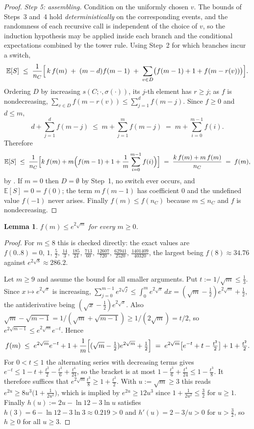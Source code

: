 \documentclass[11pt]{article}
\theoremstyle{plain}
\newtheorem{lemma}[theorem]{Lemma}
\theoremstyle{definition}
\begin{document}
\begin{proof}
\smallskip\noindent\emph{Step 5: assembling.}
Condition on the uniformly chosen $v$. The bounds of Steps~3 and~4 hold
\emph{deterministically} on the corresponding events, and the randomness
of each recursive call is independent of the choice of $v$, so the
induction hypothesis may be applied inside each branch and the
conditional expectations combined by the tower rule. Using Step~2 for
which branches incur a switch,
\[
  \mathbb{E}[S]\;\le\;\frac1{n_C}\Bigl[\,k\,f(m)\;+\;(m-d)f(m-1)\;+\;\sum_{v\in D}\bigl(f(m-1)+1+f(m-r(v))\bigr)\Bigr].
\]
Ordering $D$ by increasing $s(C;\cdot,\sigma(\cdot))$, its $j$-th element
has $r\ge j$; as $f$ is nondecreasing,
$\sum_{v\in D}f(m-r(v))\le\sum_{j=1}^{d}f(m-j)$. Since $f\ge0$ and
$d\le m$,
\[
  d+\sum_{j=1}^{d}f(m-j)\;\le\;m+\sum_{j=1}^{m}f(m-j)\;=\;m+\sum_{i=0}^{m-1}f(i).
\]
Therefore
\[
  \mathbb{E}[S]\;\le\;\frac1{n_C}\Bigl[k\,f(m)+m\Bigl(f(m-1)+1+\frac1m\sum_{i=0}^{m-1}f(i)\Bigr)\Bigr]
  \;=\;\frac{k\,f(m)+m\,f(m)}{n_C}\;=\;f(m),
\]
by . If $m=0$ then $D=\emptyset$ by Step~1, no switch ever
occurs, and $\mathbb{E}[S]=0=f(0)$; the term $m\,f(m-1)$ has coefficient
$0$ and the undefined value $f(-1)$ never arises. Finally
$f(m)\le f(n_C)$ because $m\le n_C$ and $f$ is nondecreasing.
\end{proof}

\begin{lemma}\label{lem:fbound}
$f(m)\le e^{2\sqrt m}$ for every $m\ge0$.
\end{lemma}

\begin{proof}
For $m\le8$ this is checked directly: the exact values are
$f(0..8)=0,\,1,\,\tfrac52,\,\tfrac{14}3,\,\tfrac{185}{24},\,\tfrac{713}{60},\,\tfrac{12607}{720},\,\tfrac{62941}{2520},\,\tfrac{1401409}{40320}$,
the largest being $f(8)\approx34.76$ against $e^{2\sqrt8}\approx286.2$.

Let $m\ge9$ and assume the bound for all smaller arguments. Put
$t:=1/\sqrt m\le\tfrac13$. Since $x\mapsto e^{2\sqrt x}$ is increasing,
$\sum_{j=0}^{m-1}e^{2\sqrt j}\le\int_0^{m}e^{2\sqrt x}\,dx=(\sqrt m-\tfrac12)e^{2\sqrt m}+\tfrac12$,
the antiderivative being $(\sqrt x-\tfrac12)e^{2\sqrt x}$. Also
$\sqrt m-\sqrt{m-1}=1/(\sqrt m+\sqrt{m-1})\ge 1/(2\sqrt m)=t/2$, so
$e^{2\sqrt{m-1}}\le e^{2\sqrt m}e^{-t}$. Hence
\[
  f(m)\;\le\;e^{2\sqrt m}e^{-t}+1+\frac1m\Bigl[(\sqrt m-\tfrac12)e^{2\sqrt m}+\tfrac12\Bigr]
  \;=\;e^{2\sqrt m}\bigl[e^{-t}+t-\tfrac{t^{2}}2\bigr]+1+\tfrac{t^{2}}2 .
\]
For $0<t\le1$ the alternating series with decreasing terms gives
$e^{-t}\le1-t+\tfrac{t^2}2-\tfrac{t^3}6+\tfrac{t^4}{24}$, so the bracket
is at most $1-\tfrac{t^3}6+\tfrac{t^4}{24}\le1-\tfrac{t^3}8$. It
therefore suffices that $e^{2\sqrt m}\tfrac{t^3}8\ge1+\tfrac{t^2}2$.
With $u:=\sqrt m\ge3$ this reads $e^{2u}\ge8u^{3}\bigl(1+\tfrac1{2u^{2}}\bigr)$,
which is implied by $e^{2u}\ge12u^{3}$ since
$1+\tfrac1{2u^2}\le\tfrac32$ for $u\ge1$. Finally
$h(u):=2u-\ln12-3\ln u$ satisfies $h(3)=6-\ln12-3\ln3\approx0.219>0$ and
$h'(u)=2-3/u>0$ for $u>\tfrac32$, so $h\ge0$ for all $u\ge3$.
\end{proof}
\end{document}
